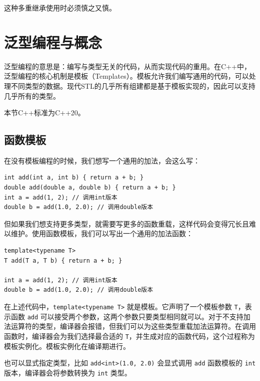 这种多重继承使用时必须慎之又慎。

\section{泛型编程与概念}

泛型编程的意思是：编写与类型无关的代码，从而实现代码的重用。在C++中，泛型编程的核心机制是模板（Templates）。模板允许我们编写通用的代码，可以处理不同类型的数据。现代STL的几乎所有组建都是基于模板实现的，因此可以支持几乎所有的类型。

本节C++标准为C++20。

\subsection{函数模板}

在没有模板编程的时候，我们想写一个通用的加法，会这么写：
\begin{verbatim}
int add(int a, int b) { return a + b; }
double add(double a, double b) { return a + b; }
int a = add(1, 2); // 调用int版本
double b = add(1.0, 2.0); // 调用double版本
\end{verbatim}
但如果我们想支持更多类型，就需要写更多的函数重载，这样代码会变得冗长且难以维护。使用函数模板，我们可以写出一个通用的加法函数：
\begin{verbatim}
template<typename T>
T add(T a, T b) { return a + b; }

int a = add(1, 2); // 调用int版本
double b = add(1.0, 2.0); // 调用double版本
\end{verbatim}
在上述代码中，\verb|template<typename T>| 就是模板。它声明了一个模板参数 \verb|T|，表示函数 \verb|add| 可以接受两个参数，这两个参数只要类型相同就可以。对于不支持加法运算符的类型，编译器会报错，但我们可以为这些类型重载加法运算符。在调用函数时，编译器会为我们选择最合适的 \verb|T|，并生成对应的函数代码，这个过程称为模板实例化。模板实例化在编译期进行。

也可以显式指定类型，比如 \texttt{add<int>(1.0, 2.0)} 会显式调用 \verb|add| 函数模板的 \verb|int| 版本，编译器会将参数转换为 \verb|int| 类型。

